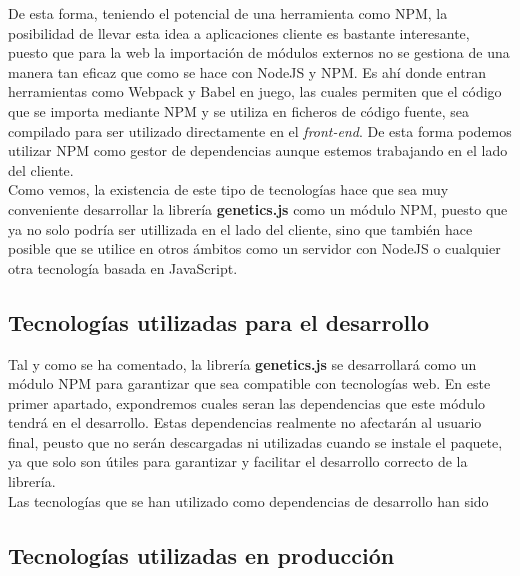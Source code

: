 De esta forma, teniendo el potencial de una herramienta como NPM, la posibilidad de llevar esta idea a aplicaciones cliente es bastante interesante, puesto que para la web la importación de módulos externos no se gestiona de una manera tan eficaz que como se hace con NodeJS y NPM. Es ahí donde entran herramientas como Webpack y Babel en juego, las cuales permiten que el código que se importa mediante NPM y se utiliza en ficheros de código fuente, sea compilado para ser utilizado directamente en el \textit{front-end}. De esta forma podemos utilizar NPM como gestor de dependencias aunque estemos trabajando en el lado del cliente. \\

Como vemos, la existencia de este tipo de tecnologías hace que sea muy conveniente desarrollar la librería \textbf{genetics.js} como un módulo NPM, puesto que ya no solo podría ser utillizada en el lado del cliente, sino que también hace posible que se utilice en otros ámbitos como un servidor con NodeJS o cualquier otra tecnología basada en JavaScript.

\subsection{Tecnologías utilizadas para el desarrollo}

Tal y como se ha comentado, la librería \textbf{genetics.js} se desarrollará como un módulo NPM para garantizar que sea compatible con tecnologías web. En este primer apartado, expondremos cuales seran las dependencias que este módulo tendrá en el desarrollo. Estas dependencias realmente no afectarán al usuario final, peusto que no serán descargadas ni utilizadas cuando se instale el paquete, ya que solo son útiles para garantizar y facilitar el desarrollo correcto de la librería. \\

Las tecnologías que se han utilizado como dependencias de desarrollo han sido

\subsection{Tecnologías utilizadas en producción}